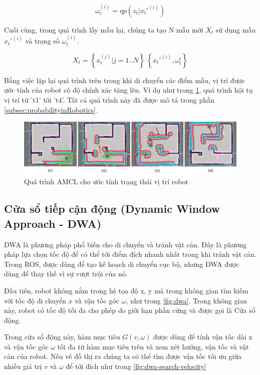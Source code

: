 {{\begin{equation}
  {\omega}_{t}^{(i)} = {\eta}p\left({z}_{t}|{x}_{t}'^{(i)}\right)
\end{equation}

Cuối cùng, trong quá trình lấy mẫu lại, chúng ta tạo N mẫu mới ${X}_{t}$ sử dụng mẫu ${{x}_{t}'}^{(i)}$ và trọng số ${\omega}_{t}^{(i)}$.

\begin{equation}
  X_t = \left\{x_t^{(j)} | j = 1..N\right\} ~  \left\{x_t'^{(i)}, {\omega}_t^{i}\right\}
\end{equation}

Bằng việc lặp lại quá trình trên trong khi di chuyển các điểm mẫu, vị trí được ước tính của robot có độ chính xác tăng lên. Ví dụ như trong \figurename{ \ref{fig:AMCLprocess}}, quá trình hội tụ vị trí từ 't1' tới 't4'. Tất cả quá trình này đã được mô tả trong phần \ref{subsec:probabilityinRobotics}. \cite{pyo2017ros}

\begin{figure}[htbp]
  \centering
  \includegraphics[width=1\linewidth]{figures/AMCL-process-for-pose-estimate.png}
  \caption{Quá trình AMCL cho ước tính trạng thái vị trí robot}
  \label{fig:AMCLprocess}
\end{figure}

\subsection{Cửa sổ tiếp cận động (Dynamic Window Approach - DWA)}
DWA là phương pháp phổ biến cho di chuyển và tránh vật cản. Đây là phương pháp lựa chọn tốc độ để có thể tới điểm đích nhanh nhất trong khi tránh vật cản. Trong ROS,  được dùng để tạo kế hoạch di chuyển cục bộ, nhưng DWA được dùng để thay thế vì sự vượt trội của nó.

Đầu tiên, robot không nằm trong hệ tọa độ x, y mà trong không gian tìm kiếm với tốc độ di chuyển $x$ và vận tốc góc $\omega$, như trong \figurename{ \ref{fig:dwa}}. Trong không gian này, robot có tốc độ tối đa cho phép do giới hạn phần cứng và được gọi là Cửa sổ động.

Trong cửa sổ động này, hàm mục tiêu $G(v, \omega)$ được dùng để tính vận tốc dài x và vận tốc góc $\omega$ tối đa từ hàm mục tiêu trên và xem xét hướng, vận tốc và vật cản của robot. Nếu vẽ đồ thị ra chúng ta có thể tìm được vận tốc tối ưu giữa nhiều giá trị $v$ và $\omega$ để tới đích như trong \figurename{ \ref{fig:dwa-search-velocity}}

}}
